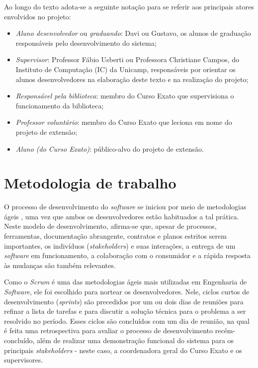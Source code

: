 \documentclass[a4paper]{article}
\begin{document}
Ao longo do texto adota-se a seguinte notação para se referir aos principais atores envolvidos no projeto:
\begin{itemize}
\item \textit{Aluno desenvolvedor} ou \textit{graduando}: Davi ou Gustavo, os alunos de graduação responsáveis pelo desenvolvimento do sistema;
\item \textit{Supervisor}: Professor Fábio Usberti ou Professora Christiane Campos, do Instituto de Computação (IC) da Unicamp, responsáveis por orientar os alunos desenvolvedores na elaboração deste texto e na realização do projeto;
\item \textit{Responsável pela biblioteca}: membro do Curso Exato que supervisiona o funcionamento da biblioteca;
\item \textit{Professor voluntário}: membro do Curso Exato que leciona em nome do projeto de extensão;
\item \textit{Aluno (do Curso Exato)}: público-alvo do projeto de extensão.
\end{itemize}


\section{Metodologia de trabalho}
O processo de desenvolvimento do \textit{software} se iniciou por meio de metodologias ágeis \cite{manifesto}, uma vez que ambos os desenvolvedores estão habituados a tal prática. Neste modelo de desenvolvimento, afirma-se que, apesar de processos, ferramentas, documentação abrangente, contratos e planos estritos serem importantes, os indivíduos (\textit{stakeholders}) e suas interações, a entrega de um \textit{software} em funcionamento, a colaboração com o consumidor e a rápida resposta às mudanças são também relevantes.

Como o \textit{Scrum} \cite{scrum} é uma das metodologias ágeis mais utilizadas em Engenharia de \textit{Software}, ele foi escolhido para nortear os desenvolvedores. Nele, ciclos curtos de desenvolvimento (\textit{sprints}) são precedidos por um ou dois dias de reuniões para refinar a lista de tarefas e para discutir a solução técnica para o problema a ser resolvido no período. Esses ciclos são concluídos com um dia de reunião, na qual é feita uma retrospectiva para avaliar o processo de desenvolvimento recém-concluído, além de realizar uma demonstração funcional do sistema para os principais \textit{stakeholders} - neste caso, a coordenadora geral do Curso Exato e os supervisores.
\end{document}
